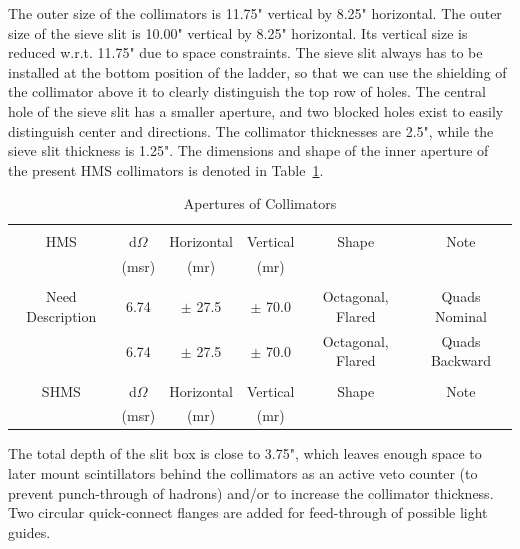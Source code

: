 {The outer size of the collimators is 11.75" vertical by 8.25"
horizontal. The outer size of the sieve slit is 10.00" vertical
by 8.25" horizontal.
Its vertical size is reduced w.r.t. 11.75" due to space constraints.
The sieve slit always has to be installed at the bottom position of the ladder,
so that we can use the shielding of the collimator above it to
clearly distinguish the top row of holes. The central hole
of the sieve slit has a smaller aperture, and two blocked holes
exist to easily distinguish center and directions.
The collimator thicknesses are 2.5", while the sieve slit thickness
is 1.25". The dimensions and shape of the inner aperture of the present
HMS collimators is denoted in Table~\ref{tab:apertures}.

\begin{table}
\begin{center}
\caption{Apertures of Collimators\label{tab:apertures}}
\vspace{\baselineskip}
\begin{tabular}{|c|c|c|c|c|c|}
\hline
{} & {} & {} & {} & {} & {} \\
HMS				& d$\Omega$ 	& Horizontal 	& Vertical 		& Shape 			& Note \\
{} 				& (msr) 		& (mr) 		& (mr) 		& {} 				& {} \\
{} & {} & {} & {} & {} & {} \\ \hline
{}Need Description	& 6.74 		& $\pm$ 27.5 	& $\pm$ 70.0 	& Octagonal, Flared 	& Quads Nominal \\
{}	 			& 6.74 		& $\pm$ 27.5 	& $\pm$ 70.0 	& Octagonal, Flared 	& Quads Backward \\
{} & {} & {} & {} & {} & {} \\ \hline
SHMS			& d$\Omega$ 	& Horizontal 	& Vertical 		& Shape 			& Note \\
{} 				& (msr) 		& (mr) 		& (mr) 		& {} 				& {} \\
\hline
\end{tabular}
\end{center}
\end{table}

The total depth of the slit box is close to 3.75", which leaves
enough space to later mount scintillators behind the collimators as an active
veto counter (to prevent punch-through of hadrons) and/or to increase
the collimator thickness. Two circular quick-connect flanges are
added for feed-through of possible light guides.

}
